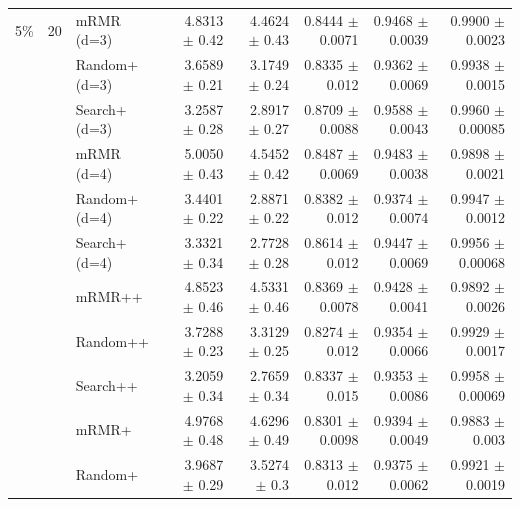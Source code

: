 \begin{longtable}{llp{}rrrrr}
\midrule
5\% & 20 & mRMR (d=3) & 4.8313 {\scriptsize $\pm$ 0.42} & 4.4624 {\scriptsize $\pm$ 0.43} & 0.8444 {\scriptsize $\pm$ 0.0071} & 0.9468 {\scriptsize $\pm$ 0.0039} & 0.9900 {\scriptsize $\pm$ 0.0023} \\
 &  & Random+ (d=3) & 3.6589 {\scriptsize $\pm$ 0.21} & 3.1749 {\scriptsize $\pm$ 0.24} & 0.8335 {\scriptsize $\pm$ 0.012} & 0.9362 {\scriptsize $\pm$ 0.0069} & 0.9938 {\scriptsize $\pm$ 0.0015} \\
 &  & Search+ (d=3) & 3.2587 {\scriptsize $\pm$ 0.28} & 2.8917 {\scriptsize $\pm$ 0.27} & 0.8709 {\scriptsize $\pm$ 0.0088} & 0.9588 {\scriptsize $\pm$ 0.0043} & 0.9960 {\scriptsize $\pm$ 0.00085} \\
 &  & mRMR (d=4) & 5.0050 {\scriptsize $\pm$ 0.43} & 4.5452 {\scriptsize $\pm$ 0.42} & 0.8487 {\scriptsize $\pm$ 0.0069} & 0.9483 {\scriptsize $\pm$ 0.0038} & 0.9898 {\scriptsize $\pm$ 0.0021} \\
 &  & Random+ (d=4) & 3.4401 {\scriptsize $\pm$ 0.22} & 2.8871 {\scriptsize $\pm$ 0.22} & 0.8382 {\scriptsize $\pm$ 0.012} & 0.9374 {\scriptsize $\pm$ 0.0074} & 0.9947 {\scriptsize $\pm$ 0.0012} \\
 &  & Search+ (d=4) & 3.3321 {\scriptsize $\pm$ 0.34} & 2.7728 {\scriptsize $\pm$ 0.28} & 0.8614 {\scriptsize $\pm$ 0.012} & 0.9447 {\scriptsize $\pm$ 0.0069} & 0.9956 {\scriptsize $\pm$ 0.00068} \\
 &  & mRMR++ & 4.8523 {\scriptsize $\pm$ 0.46} & 4.5331 {\scriptsize $\pm$ 0.46} & 0.8369 {\scriptsize $\pm$ 0.0078} & 0.9428 {\scriptsize $\pm$ 0.0041} & 0.9892 {\scriptsize $\pm$ 0.0026} \\
 &  & Random++ & 3.7288 {\scriptsize $\pm$ 0.23} & 3.3129 {\scriptsize $\pm$ 0.25} & 0.8274 {\scriptsize $\pm$ 0.012} & 0.9354 {\scriptsize $\pm$ 0.0066} & 0.9929 {\scriptsize $\pm$ 0.0017} \\
 &  & Search++ & 3.2059 {\scriptsize $\pm$ 0.34} & 2.7659 {\scriptsize $\pm$ 0.34} & 0.8337 {\scriptsize $\pm$ 0.015} & 0.9353 {\scriptsize $\pm$ 0.0086} & 0.9958 {\scriptsize $\pm$ 0.00069} \\
 &  & mRMR+ & 4.9768 {\scriptsize $\pm$ 0.48} & 4.6296 {\scriptsize $\pm$ 0.49} & 0.8301 {\scriptsize $\pm$ 0.0098} & 0.9394 {\scriptsize $\pm$ 0.0049} & 0.9883 {\scriptsize $\pm$ 0.003} \\
 &  & Random+ & 3.9687 {\scriptsize $\pm$ 0.29} & 3.5274 {\scriptsize $\pm$ 0.3} & 0.8313 {\scriptsize $\pm$ 0.012} & 0.9375 {\scriptsize $\pm$ 0.0062} & 0.9921 {\scriptsize $\pm$ 0.0019} \\

\end{longtable}
